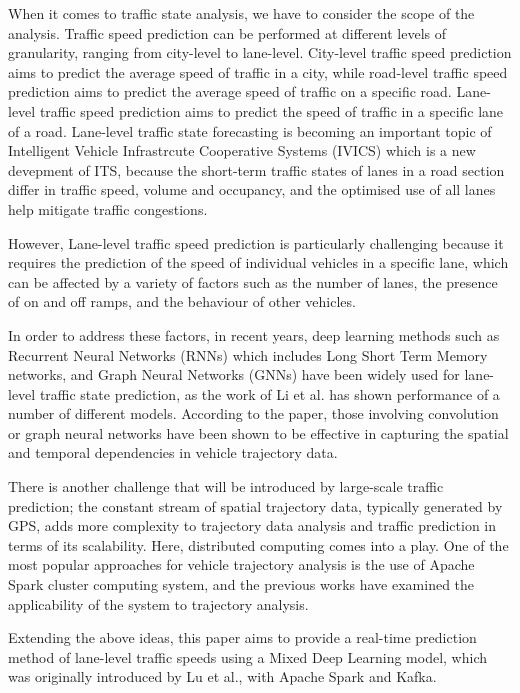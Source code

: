 \documentclass[11pt]{uonthesis}
\begin{document}
When it comes to traffic state analysis, we have to consider the scope of the analysis. Traffic speed prediction can be performed at different levels of granularity, ranging from city-level to lane-level. City-level traffic speed prediction aims to predict the average speed of traffic in a city, while road-level traffic speed prediction aims to predict the average speed of traffic on a specific road. Lane-level traffic speed prediction aims to predict the speed of traffic in a specific lane of a road. Lane-level traffic state forecasting is becoming an important topic of Intelligent Vehicle Infrastrcute Cooperative Systems (IVICS) which is a new devepment of ITS, because the short-term traffic states of lanes in a road section differ in traffic speed, volume and occupancy\cite{GU20191}, and the optimised use of all lanes help mitigate traffic congestions. 

However, Lane-level traffic speed prediction is particularly challenging because it requires the prediction of the speed of individual vehicles in a specific lane, which can be affected by a variety of factors such as the number of lanes, the presence of on and off ramps, and the behaviour of other vehicles.

In order to address these factors, in recent years, deep learning methods such as Recurrent Neural Networks (RNNs) which includes Long Short Term Memory networks, and Graph Neural Networks (GNNs) have been widely used for lane-level traffic state prediction, as the work of Li et al.\cite{li2024unifyinglaneleveltrafficprediction} has shown performance of a number of different models. According to the paper, those involving convolution or graph neural networks have been shown to be effective in capturing the spatial and temporal dependencies in vehicle trajectory data.

There is another challenge that will be introduced by large-scale traffic prediction; the constant stream of spatial trajectory data, typically generated by GPS, adds more complexity to trajectory data analysis and traffic prediction in terms of its scalability. Here, distributed computing comes into a play. One of the most popular approaches for vehicle trajectory analysis is the use of Apache Spark cluster computing system, and the previous works\cite{9077707}\cite{Sigurdsson2018RoadTC} have examined the applicability of the system to trajectory analysis.

Extending the above ideas, this paper aims to provide a real-time prediction method of lane-level traffic speeds using a Mixed Deep Learning model, which was originally introduced by Lu et al.\cite{9284587}, with Apache Spark and Kafka. 
\end{document}
